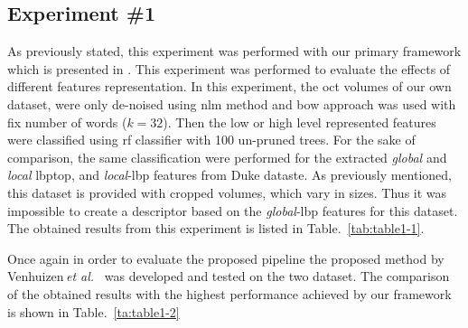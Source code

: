 \subsection{Experiment \#1}\label{subsec:exp1}
As previously stated, this experiment was performed with our primary framework which is presented in \cite{Lemaintre2015miccaiOCT}.
This experiment was performed to evaluate the effects of different features representation.
In this experiment, the \ac{oct} volumes of our own dataset, were only de-noised using \ac{nlm} method and \ac{bow} approach was used with fix number of words ($k = 32$).
Then the low or high level represented features were classified using \ac{rf} classifier with 100 un-pruned trees.  
For the sake of comparison, the same classification were performed for the extracted \emph{global} and \emph{local} \ac{lbptop}, and \emph{local}-\ac{lbp} features from Duke dataste.
As previously mentioned, this dataset is provided with cropped volumes, which vary in sizes.
Thus it was impossible to create a descriptor based on the \emph{global}-\ac{lbp} features for this dataset.
The obtained results from this experiment is listed in Table.~\ref{tab:table1-1}.


Once again in order to evaluate the proposed pipeline the proposed method by Venhuizen\,\textit{et al.}~\cite{Venhuizen2015} was developed and tested on the two dataset. The comparison of the obtained results with the highest performance achieved by our framework is shown in Table.~\ref{ta:table1-2}
\label{subsec:exp2}

